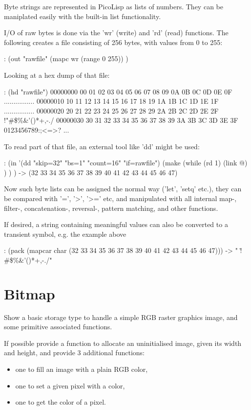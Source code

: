 \begin{wideverbatim}

Byte strings are represented in PicoLisp as lists of numbers. They can be
maniplated easily with the built-in list functionality.

I/O of raw bytes is done via the 'wr' (write) and 'rd' (read) functions. The
following creates a file consisting of 256 bytes, with values from 0 to 255:

: (out "rawfile"
   (mapc wr (range 0 255)) )

Looking at a hex dump of that file:

: (hd "rawfile")
00000000  00 01 02 03 04 05 06 07 08 09 0A 0B 0C 0D 0E 0F  ................
00000010  10 11 12 13 14 15 16 17 18 19 1A 1B 1C 1D 1E 1F  ................
00000020  20 21 22 23 24 25 26 27 28 29 2A 2B 2C 2D 2E 2F   !"#\$\%\&'()*+,-./
00000030  30 31 32 33 34 35 36 37 38 39 3A 3B 3C 3D 3E 3F  0123456789:;<=>?
...


To read part of that file, an external tool like 'dd' might be used:

: (in '(dd "skip=32" "bs=1" "count=16" "if=rawfile")
   (make
      (while (rd 1)
         (link @) ) ) )
-> (32 33 34 35 36 37 38 39 40 41 42 43 44 45 46 47)

Now such byte lists can be assigned the normal way ('let', 'setq' etc.), they
can be compared with '=', '>', '>=' etc, and manipulated with all internal map-,
filter-, concatenation-, reversal-, pattern matching, and other functions.

If desired, a string containing meaningful values can also be converted to
a transient symbol, e.g. the example above

: (pack (mapcar char (32 33 34 35 36 37 38 39 40 41 42 43 44 45 46 47)))
-> " !\"#\$\%\&'()*+,-./"

\end{wideverbatim}

\pagebreak{}
\section*{Bitmap}


Show a basic storage type to handle a simple RGB raster graphics image,
and some primitive associated functions.

If possible provide a function to allocate an uninitialised image, given
its width and height, and provide 3 additional functions:

\begin{itemize}
\item
  one to fill an image with a plain RGB color,
\item
  one to set a given pixel with a color,
\item
  one to get the color of a pixel.
\end{itemize}

